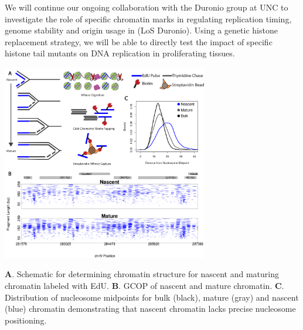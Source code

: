 We will continue our ongoing collaboration with the Duronio group at UNC to investigate the role of specific chromatin marks in regulating replication timing, genome stability and origin usage in \dros\citep{Li2016-fi}(LoS Duronio). Using a genetic histone replacement strategy\citep{McKay2015-nn}, we will be able to directly test the impact of specific histone tail mutants on DNA replication in proliferating tissues. %
\begin{floatingfigure}[l]{3.55in}
\vspace{-6mm}
\begin{center}
\includegraphics[width=3.55in]{r35_figures/dave_figure2.png}
\end{center}
\vspace{2mm}
\caption{\textbf{A}. Schematic for determining chromatin structure for nascent and maturing chromatin labeled with EdU. \textbf{B}. GCOP of nascent and mature chromatin. \textbf{C}.  Distribution of nucleosome midpoints for bulk (black), mature (gray) and nascent (blue) chromatin demonstrating that nascent chromatin lacks precise nucleosome positioning.}%
\end{floatingfigure}


